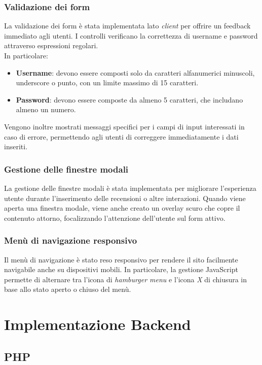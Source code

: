 \documentclass[a4paper, 12pt]{article}
\begin{document}
\begin{justify}
\subsubsection{Validazione dei form}

La validazione dei form è stata implementata lato \textit{client} per offrire un feedback immediato agli utenti. I controlli verificano la correttezza di username e password attraverso espressioni regolari.\\
In particolare:
\begin{itemize}
    \item \textbf{Username}: devono essere composti solo da caratteri alfanumerici minuscoli, underscore o punto, con un limite massimo di 15 caratteri.
    \item \textbf{Password}: devono essere composte da almeno 5 caratteri, che includano almeno un numero.
\end{itemize}
Vengono inoltre mostrati messaggi specifici per i campi di input interessati in  caso di errore, permettendo agli utenti di correggere immediatamente i dati inseriti.

\subsubsection{Gestione delle finestre modali}

La gestione delle finestre modali è stata implementata per migliorare l'esperienza utente durante l'inserimento delle recensioni o altre interazioni. Quando viene aperta una finestra modale, viene anche creato un overlay scuro che copre il contenuto attorno, focalizzando l'attenzione dell'utente sul form attivo.

\subsubsection{Menù di navigazione responsivo}

Il menù di navigazione è stato reso responsivo per rendere il sito facilmente navigabile anche su dispositivi mobili. In particolare, la gestione JavaScript permette di alternare tra l'icona di \textit{hamburger menu} e l'icona \textit{X} di chiusura in base allo stato aperto o chiuso del menù.


\section{Implementazione Backend}

\subsection{PHP}


\end{justify}
\end{document}

